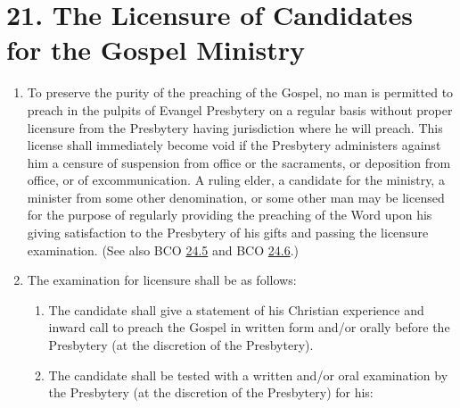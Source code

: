 \documentclass[
]{book}
\providecommand{\tightlist}{%
  \setlength{\itemsep}{0pt}\setlength{\parskip}{0pt}}
\begin{document}
\hypertarget{the-licensure-of-candidates-for-the-gospel-ministry}{%
\section*{21. The Licensure of Candidates for the Gospel Ministry}\label{the-licensure-of-candidates-for-the-gospel-ministry}}

\protect\hypertarget{chapter-slug-21-the-licensure-of-candidates-for-the-gospel-ministry}{\href{}{}}

\begin{enumerate}
\def\labelenumi{\arabic{enumi}.}
\item
  \protect\hypertarget{21}{\href{}{}}\protect\hypertarget{21.1}{\href{}{}}To preserve the purity of the preaching of the Gospel, no man is permitted to preach in the pulpits of Evangel Presbytery on a regular basis without proper licensure from the Presbytery having jurisdiction where he will preach. This license shall immediately become void if the Presbytery administers against him a censure of suspension from office or the sacraments, or deposition from office, or of excommunication. A ruling elder, a candidate for the ministry, a minister from some other denomination, or some other man may be licensed for the purpose of regularly providing the preaching of the Word upon his giving satisfaction to the Presbytery of his gifts and passing the licensure examination. (See also BCO \protect\hyperlink{24.5}{24.5} and BCO \protect\hyperlink{24.6}{24.6}.)
\item
  \protect\hypertarget{21.2}{\href{}{}}The examination for licensure shall be as follows:

  \begin{enumerate}
  \def\labelenumii{\alph{enumii}.}
  \tightlist
  \item
    The candidate shall give a statement of his Christian experience and inward call to preach the Gospel in written form and/or orally before the Presbytery (at the discretion of the Presbytery).
  \item
    The candidate shall be tested with a written and/or oral examination by the Presbytery (at the discretion of the Presbytery) for his:


\end{enumerate}
\end{enumerate}
\end{document}
